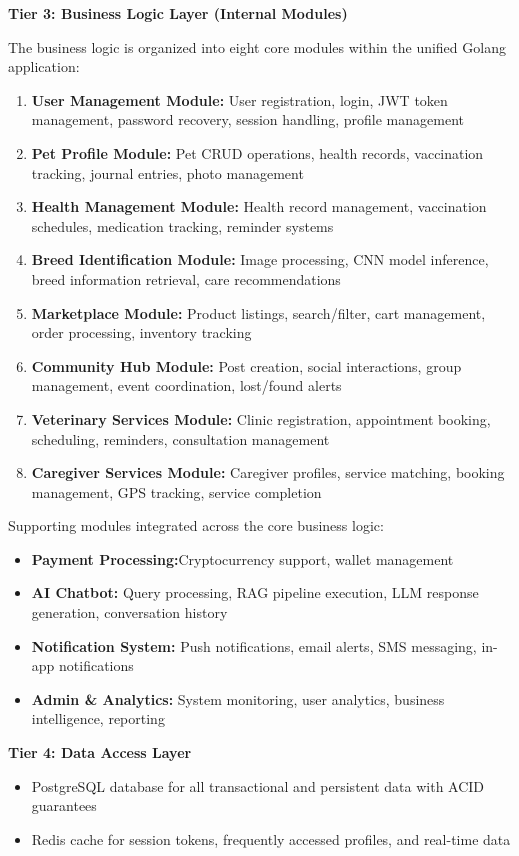 \textbf{Tier 3: Business Logic Layer (Internal Modules)}

The business logic is organized into eight core modules within the unified Golang application:

\begin{enumerate}
    \item \textbf{User Management Module:} User registration, login, JWT token management, password recovery, session handling, profile management
    \item \textbf{Pet Profile Module:} Pet CRUD operations, health records, vaccination tracking, journal entries, photo management
    \item \textbf{Health Management Module:} Health record management, vaccination schedules, medication tracking, reminder systems
    \item \textbf{Breed Identification Module:} Image processing, CNN model inference, breed information retrieval, care recommendations
    \item \textbf{Marketplace Module:} Product listings, search/filter, cart management, order processing, inventory tracking
    \item \textbf{Community Hub Module:} Post creation, social interactions, group management, event coordination, lost/found alerts
    \item \textbf{Veterinary Services Module:} Clinic registration, appointment booking, scheduling, reminders, consultation management
    \item \textbf{Caregiver Services Module:} Caregiver profiles, service matching, booking management, GPS tracking, service completion
\end{enumerate}

Supporting modules integrated across the core business logic:
\begin{itemize}
    \item \textbf{Payment Processing:}Cryptocurrency support, wallet management
    \item \textbf{AI Chatbot:} Query processing, RAG pipeline execution, LLM response generation, conversation history
    \item \textbf{Notification System:} Push notifications, email alerts, SMS messaging, in-app notifications
    \item \textbf{Admin \& Analytics:} System monitoring, user analytics, business intelligence, reporting
\end{itemize}

\textbf{Tier 4: Data Access Layer}
\begin{itemize}
    \item PostgreSQL database for all transactional and persistent data with ACID guarantees
    \item Redis cache for session tokens, frequently accessed profiles, and real-time data
  
\end{itemize}

